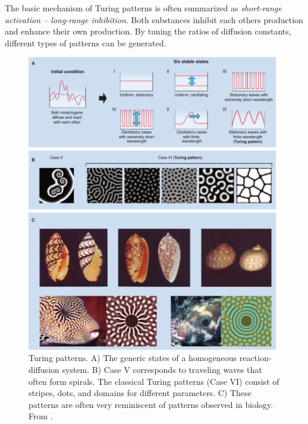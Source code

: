 The basic mechanism of Turing patterns is often summarized as {\it short-range activation -- long-range inhibition}.
Both substances inhibit each others production and enhance their own production.
By tuning the ratios of diffusion constants, different types of patterns can be generated.

\begin{figure}[tb]
	\centering
	\includegraphics[width=0.98\textwidth]{figures/Kondo_Turing_patterns.png}
	\caption{Turing patterns. A) The generic states of a homogeneous reaction-diffusion system. B) Case V corresponds to traveling waves that often form spirals. The classical Turing patterns (Case VI) consist of stripes, dots, and domains for different parameters.
	C) These patterns are often very reminiscent of patterns observed in biology.
	From \citep{kondo_reaction-diffusion_2010}.}
	\label{fig:turing}
\end{figure}

